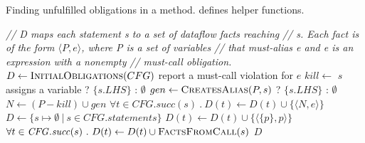\begin{algorithm}[t]
  \caption{Finding unfulfilled \MustCall obligations in a method.
     defines helper functions.
  }
  \label{alg:consistency-checker}
  \begin{algorithmic}[1]
  \State \textit{// D maps each statement s to a set of dataflow facts reaching}
  \State \textit{// s.  Each fact is of the form $\langle P, e \rangle$, where P is a set of variables}
  \State \textit{// that must-alias e and e is an expression with a nonempty}
  \State \textit{// must-call obligation.}
  \State $D \gets \textsc{InitialObligations}(CFG)$ \label{li:call-initial-obs}
     \label{li:end-scope}
      \State report a must-call violation for $e$
     \label{li:check-satisfied}
    \State $kill \gets $ $s$ assigns a variable ? $\{s.LHS\}$ : $\emptyset$ \label{li:compute-kill}
    \State $gen \gets \textsc{CreatesAlias}(P,s)$ ? $\{s.LHS\}$ : $\emptyset$ \label{li:compute-gen} 
    \State $N \gets (P - kill) \cup gen$ \label{li:compute-new-mc-aliases}
    \State $\forall t \in \mathit{CFG.succ}(s)\ .\ D(t) \leftarrow D(t) \cup \lbrace \langle
    N, e \rangle \rbrace$ \label{li:prop-to-succs}
    \EndIf
    \EndFor
  \EndWhile \label{li:alg-loop-end}
  \EndProcedure
  \State $D \gets \{ s \mapsto \emptyset\ |\ s \in \mathit{CFG.statements} \}$\label{li:start-init}
  \label{li:init-formals}
      \State $D(t) \gets D(t) \cup \lbrace \langle \{p\}, p \rangle \rbrace$
    \EndIf
  \EndFor \label{li:end-init-formals}
   \label{li:init-calls}
    \State $\forall t \in \mathit{CFG.succ}(s)\ .\ D(t) \leftarrow D(t) \cup \textsc{FactsFromCall}(s)$
  \EndFor  \label{li:end-init}
  \State \Return $D$
  \EndProcedure
  \end{algorithmic}
\end{algorithm}
